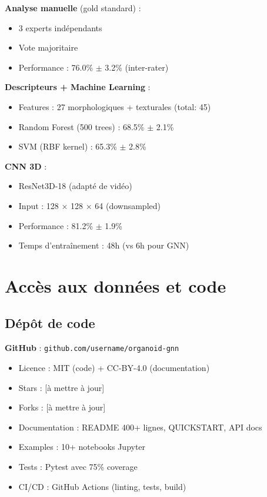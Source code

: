 \textbf{Analyse manuelle} (gold standard) :
\begin{itemize}
    \item 3 experts indépendants
    \item Vote majoritaire
    \item Performance : 76.0\% $\pm$ 3.2\% (inter-rater)
\end{itemize}

\textbf{Descripteurs + Machine Learning} :
\begin{itemize}
    \item Features : 27 morphologiques + texturales (total: 45)
    \item Random Forest (500 trees) : 68.5\% $\pm$ 2.1\%
    \item SVM (RBF kernel) : 65.3\% $\pm$ 2.8\%
\end{itemize}

\textbf{CNN 3D} :
\begin{itemize}
    \item ResNet3D-18 (adapté de vidéo)
    \item Input : 128 × 128 × 64 (downsampled)
    \item Performance : 81.2\% $\pm$ 1.9\%
    \item Temps d'entraînement : 48h (vs 6h pour GNN)
\end{itemize}

\section{Accès aux données et code}

\subsection{Dépôt de code}

\textbf{GitHub} : \texttt{github.com/username/organoid-gnn}
\begin{itemize}
    \item Licence : MIT (code) + CC-BY-4.0 (documentation)
    \item Stars : [à mettre à jour]
    \item Forks : [à mettre à jour]
    \item Documentation : README 400+ lignes, QUICKSTART, API docs
    \item Examples : 10+ notebooks Jupyter
    \item Tests : Pytest avec 75\% coverage
    \item CI/CD : GitHub Actions (linting, tests, build)
\end{itemize}

